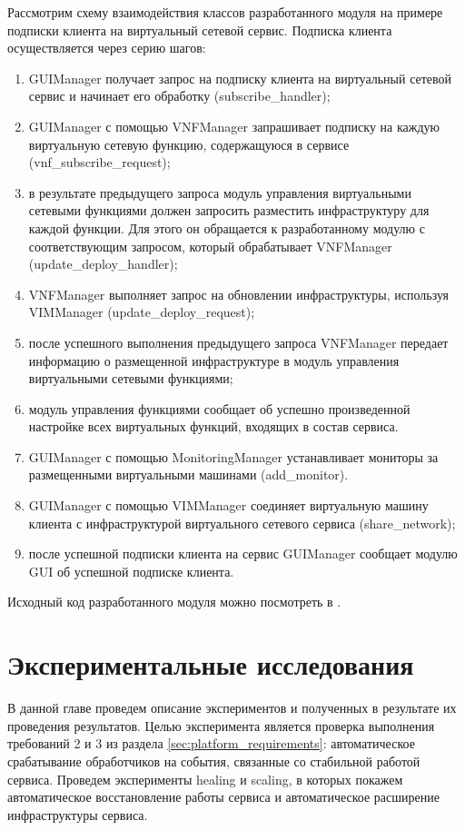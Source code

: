 \documentclass[oneside,final,14pt,a4paper]{extreport}
\begin{document}
Рассмотрим схему взаимодействия классов разработанного модуля на примере подписки клиента на виртуальный сетевой сервис. Подписка клиента осуществляется через серию шагов:
\begin{enumerate}
	\item GUIManager получает запрос на подписку клиента на виртуальный сетевой сервис и начинает его обработку (subscribe\_handler);
	\item GUIManager с помощью VNFManager запрашивает подписку на каждую виртуальную сетевую функцию, содержащуюся в сервисе (vnf\_subscribe\_request);
	\item в результате предыдущего запроса модуль управления виртуальными сетевыми функциями должен запросить разместить инфраструктуру для каждой функции. Для этого он обращается к разработанному модулю с соответствующим запросом, который обрабатывает VNFManager (update\_deploy\_handler);
	\item VNFManager выполняет запрос на обновлении инфраструктуры, используя VIMManager (update\_deploy\_request);
	\item после успешного выполнения предыдущего запроса VNFManager передает информацию о размещенной инфраструктуре в модуль управления виртуальными сетевыми функциями;
	\item модуль управления функциями сообщает об успешно произведенной настройке всех виртуальных функций, входящих в состав сервиса.
	\item GUIManager с помощью MonitoringManager устанавливает мониторы за размещенными виртуальными машинами (add\_monitor). 
	\item GUIManager с помощью VIMManager соединяет виртуальную машину клиента с инфраструктурой виртуального сетевого сервиса (share\_network);
	\item после успешной подписки клиента на сервис GUIManager сообщает модулю GUI об успешной подписке клиента.
\end{enumerate}

Исходный код разработанного модуля можно посмотреть в \cite{bib:source-code}.





\chapter{Экспериментальные исследования}
\label{chap:expirements}
В данной главе проведем описание экспериментов и полученных в результате их проведения результатов. Целью эксперимента является проверка выполнения требований 2 и 3 из раздела \ref{sec:platform_requirements}: автоматическое срабатывание обработчиков на события, связанные со стабильной работой сервиса. Проведем эксперименты healing и scaling, в которых покажем автоматическое восстановление работы сервиса и автоматическое расширение инфраструктуры сервиса.
\end{document}
